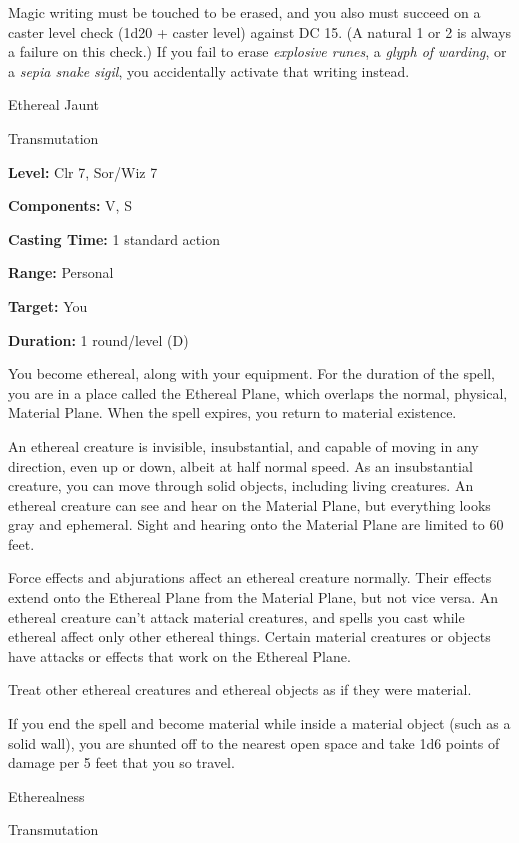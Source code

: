 \documentclass{article}
\begin{document}
Magic writing must be touched to be erased, and you also must succeed on a caster 
level check (1d20 + caster level) against DC 15. (A natural 1 or 2 is always a 
failure on this check.) If you fail to erase \textit{explosive runes}, a \textit{glyph 
of warding}, or a \textit{sepia snake sigil}, you accidentally activate that writing 
instead.

\vspace{12pt}
Ethereal Jaunt

Transmutation

\textbf{Level:} Clr 7, Sor/Wiz 7

\textbf{Components:} V, S

\textbf{Casting Time:} 1 standard action

\textbf{Range:} Personal

\textbf{Target:} You

\textbf{Duration:} 1 round/level (D)

You become ethereal, along with your equipment. For the duration of the spell, 
you are in a place called the Ethereal Plane, which overlaps the normal, physical, 
Material Plane. When the spell expires, you return to material existence.

An ethereal creature is invisible, insubstantial, and capable of moving in any 
direction, even up or down, albeit at half normal speed. As an insubstantial creature, 
you can move through solid objects, including living creatures. An ethereal creature 
can see and hear on the Material Plane, but everything looks gray and ephemeral. 
Sight and hearing onto the Material Plane are limited to 60 feet.

Force effects and abjurations affect an ethereal creature normally. Their effects 
extend onto the Ethereal Plane from the Material Plane, but not vice versa. An 
ethereal creature can't attack material creatures, and spells you cast while ethereal 
affect only other ethereal things. Certain material creatures or objects have attacks 
or effects that work on the Ethereal Plane.

Treat other ethereal creatures and ethereal objects as if they were material. 

If you end the spell and become material while inside a material object (such as 
a solid wall), you are shunted off to the nearest open space and take 1d6 points 
of damage per 5 feet that you so travel.

\vspace{12pt}
Etherealness

Transmutation
\end{document}
